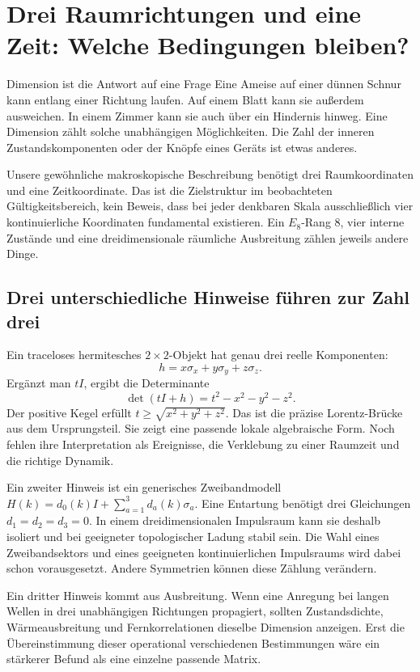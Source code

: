 \chapter{Drei Raumrichtungen und eine Zeit: Welche Bedingungen bleiben?}
\label{ch:shadow-dimension}
\begin{bild}{Dimension ist die Antwort auf eine Frage}
Eine Ameise auf einer dünnen Schnur kann entlang einer Richtung laufen. Auf einem Blatt kann sie außerdem ausweichen. In einem Zimmer kann sie auch über ein Hindernis hinweg. Eine Dimension zählt solche unabhängigen Möglichkeiten. Die Zahl der inneren Zustandskomponenten oder der Knöpfe eines Geräts ist etwas anderes.
\end{bild}

Unsere gewöhnliche makroskopische Beschreibung benötigt drei Raumkoordinaten und eine Zeitkoordinate. Das ist die Zielstruktur im beobachteten Gültigkeitsbereich, kein Beweis, dass bei jeder denkbaren Skala ausschließlich vier kontinuierliche Koordinaten fundamental existieren. Ein $E_8$-Rang 8, vier interne Zustände und eine dreidimensionale räumliche Ausbreitung zählen jeweils andere Dinge.

\section{Drei unterschiedliche Hinweise führen zur Zahl drei}
Ein traceloses hermitesches $2\times2$-Objekt hat genau drei reelle Komponenten:
\[
 h=x\sigma_x+y\sigma_y+z\sigma_z.
\]
Ergänzt man $tI$, ergibt die Determinante
\[
 \det(tI+h)=t^2-x^2-y^2-z^2.
\]
Der positive Kegel erfüllt $t\geq\sqrt{x^2+y^2+z^2}$. Das ist die präzise Lorentz-Brücke aus dem Ursprungsteil. Sie zeigt eine passende lokale algebraische Form. Noch fehlen ihre Interpretation als Ereignisse, die Verklebung zu einer Raumzeit und die richtige Dynamik.

Ein zweiter Hinweis ist ein generisches Zweibandmodell $H(k)=d_0(k)I+\sum_{a=1}^3d_a(k)\sigma_a$. Eine Entartung benötigt drei Gleichungen $d_1=d_2=d_3=0$. In einem dreidimensionalen Impulsraum kann sie deshalb isoliert und bei geeigneter topologischer Ladung stabil sein. Die Wahl eines Zweibandsektors und eines geeigneten kontinuierlichen Impulsraums wird dabei schon vorausgesetzt. Andere Symmetrien können diese Zählung verändern. 

Ein dritter Hinweis kommt aus Ausbreitung. Wenn eine Anregung bei langen Wellen in drei unabhängigen Richtungen propagiert, sollten Zustandsdichte, Wärmeausbreitung und Fernkorrelationen dieselbe Dimension anzeigen. Erst die Übereinstimmung dieser operational verschiedenen Bestimmungen wäre ein stärkerer Befund als eine einzelne passende Matrix.

